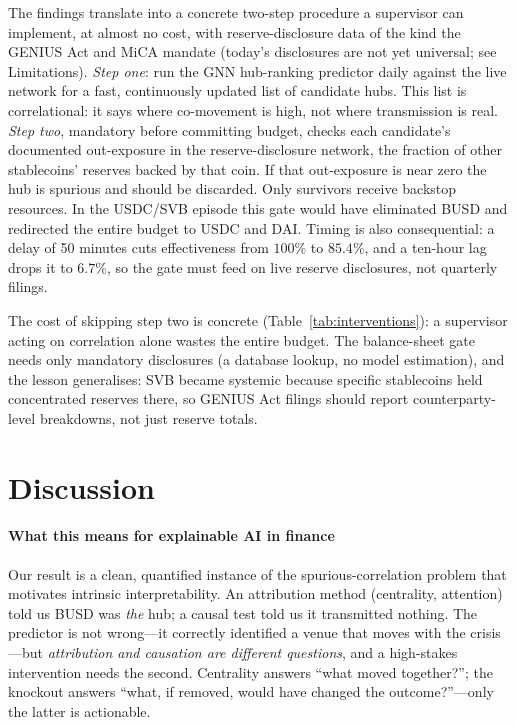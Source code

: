\documentclass[sigconf,anonymous]{acmart}
\begin{document}
The findings translate into a concrete two-step procedure a supervisor can implement, at almost
no cost, with reserve-disclosure data of the kind the GENIUS Act and MiCA mandate (today's
disclosures are not yet universal; see Limitations). \emph{Step one}: run the
GNN hub-ranking predictor daily against the live network for a fast, continuously updated list of
candidate hubs. This list is correlational: it says where co-movement is high, not where
transmission is real. \emph{Step two}, mandatory before committing budget, checks each candidate's
documented out-exposure in the reserve-disclosure network, the fraction of other stablecoins'
reserves backed by that coin. If that out-exposure is near zero the hub is spurious and should be
discarded. Only survivors receive backstop resources. In the USDC/SVB episode this gate would have
eliminated BUSD and redirected the entire budget to USDC and DAI.
Timing is also consequential: a delay of 50 minutes cuts effectiveness from $100\%$
to $85.4\%$, and a ten-hour lag drops it to $6.7\%$, so the gate must feed on live
reserve disclosures, not quarterly filings.

The cost of skipping step two is concrete (Table~\ref{tab:interventions}): a supervisor acting on
correlation alone wastes the entire budget. The balance-sheet gate needs only mandatory
disclosures (a database lookup, no model estimation), and the lesson generalises: SVB became systemic
because specific stablecoins held concentrated reserves there, so GENIUS Act filings should report
counterparty-level breakdowns, not just reserve totals.

\section{Discussion}
\paragraph{What this means for explainable AI in finance} Our result is a clean, quantified instance
of the spurious-correlation problem that motivates intrinsic interpretability. An attribution method
(centrality, attention) told us BUSD was \emph{the} hub; a causal test told us it transmitted nothing.
The predictor is not wrong---it correctly identified a venue that moves with the crisis---but
\emph{attribution and causation are different questions}, and a high-stakes intervention needs the
second. Centrality answers ``what moved together?''; the knockout answers ``what, if removed, would
have changed the outcome?''---only the latter is actionable.
\end{document}
